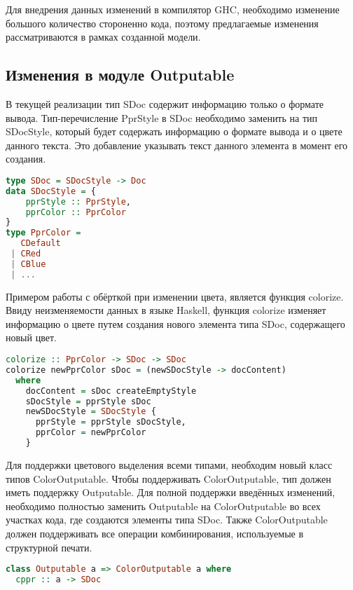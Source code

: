 Для внедрения данных изменений в компилятор GHC, необходимо изменение большого количество стороненно кода, поэтому предлагаемые изменения рассматриваются в рамках созданной модели.

\subsection{Изменения в модуле Outputable}

В текущей реализации тип SDoc содержит информацию только о формате вывода. Тип-перечисление PprStyle в SDoc необходимо заменить на тип SDocStyle, который будет содержать информацию о формате вывода и о цвете данного текста. Это добавление указывать текст данного элемента в момент его создания.

\begin{lstlisting}[language=Haskell, caption=Дополненная реализация типа SDoc]
type SDoc = SDocStyle -> Doc
data SDocStyle = {
    pprStyle :: PprStyle,
    pprColor :: PprColor
}
type PprColor =
   CDefault
 | CRed
 | CBlue
 | ...
\end{lstlisting}

Примером работы с обёрткой при изменении цвета, является функция colorize. Ввиду неизменяемости данных в языке Haskell, функция colorize изменяет информацию о цвете путем создания нового элемента типа SDoc, содержащего новый цвет.

\begin{lstlisting}[language=Haskell, caption=Пример функции окраски]
colorize :: PprColor -> SDoc -> SDoc
colorize newPprColor sDoc = (newSDocStyle -> docContent)
  where 
    docContent = sDoc createEmptyStyle
    sDocStyle = pprStyle sDoc  
    newSDocStyle = SDocStyle { 
      pprStyle = pprStyle sDocStyle, 
      pprColor = newPprColor 
    }
\end{lstlisting}

Для поддержки цветового выделения всеми типами, необходим новый класс типов ColorOutputable. Чтобы поддерживать ColorOutputable, тип должен иметь поддержку Outputable. Для полной поддержки введённых изменений, необходимо полностью заменить Outputable на ColorOutputable во всех участках кода, где создаются элементы типа SDoc. Также ColorOutputable должен поддерживать все операции комбинирования, используемые в структурной печати.

\begin{lstlisting}[language=Haskell, caption=Класс типов ColorOutputable]
class Outputable a => ColorOutputable a where
  cppr :: a -> SDoc
\end{lstlisting}

